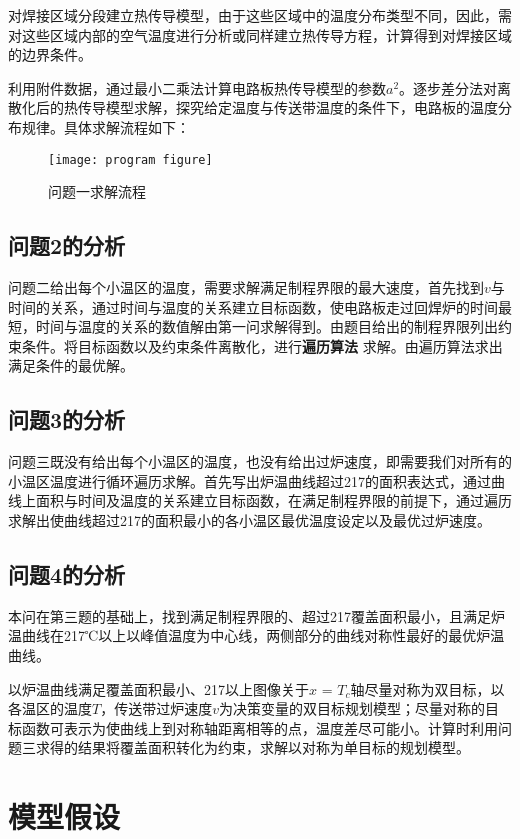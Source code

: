 \documentclass[withoutpreface,bwprint]{cumcmthesis} %
\numberwithin{equation}{subsection}
\begin{document}
对焊接区域分段建立热传导模型，由于这些区域中的温度分布类型不同，因此，需对这些区域内部的空气温度进行分析或同样建立热传导方程，计算得到对焊接区域的边界条件。

利用附件数据，通过最小二乘法计算电路板热传导模型的参数$a^2$。逐步差分法对离散化后的热传导模型求解，探究给定温度与传送带温度的条件下，电路板的温度分布规律。具体求解流程如下：




\begin{figure}[!h]
    \centering
    \texttt{[image: program figure]}
    \caption{问题一求解流程}
    \label{fig:program_figure}
\end{figure}


\subsection{问题2的分析}
问题二给出每个小温区的温度，需要求解满足制程界限的最大速度，首先找到$v$与时间的关系，通过时间与温度的关系建立目标函数，使电路板走过回焊炉的时间最短，时间与温度的关系的数值解由第一问求解得到。由题目给出的制程界限列出约束条件。将目标函数以及约束条件离散化，进行\textbf{遍历算法} 求解。由遍历算法求出满足条件的最优解。

\subsection{问题3的分析}
问题三既没有给出每个小温区的温度，也没有给出过炉速度，即需要我们对所有的小温区温度进行循环遍历求解。首先写出炉温曲线超过217\textcelsius 的面积表达式，通过曲线上面积与时间及温度的关系建立目标函数，在满足制程界限的前提下，通过遍历求解出使曲线超过217\textcelsius 的面积最小的各小温区最优温度设定以及最优过炉速度。

\subsection{问题4的分析}
本问在第三题的基础上，找到满足制程界限的、超过217\textcelsius 覆盖面积最小，且满足炉温曲线在217℃以上以峰值温度为中心线，两侧部分的曲线对称性最好的最优炉温曲线。

以炉温曲线满足覆盖面积最小、217\textcelsius 以上图像关于$x$ = $T_{c}$轴尽量对称为双目标，以各温区的温度$T$，传送带过炉速度$v$为决策变量的双目标规划模型；尽量对称的目标函数可表示为使曲线上到对称轴距离相等的点，温度差尽可能小。计算时利用问题三求得的结果将覆盖面积转化为约束，求解以对称为单目标的规划模型。
\section{模型假设}
\end{document}
